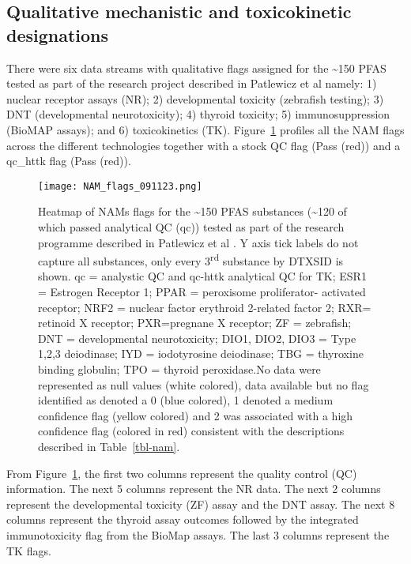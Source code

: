 \documentclass[
  super,
  preprint,
  3p]{elsarticle}
\begin{document}
\hypertarget{qualitative-mechanistic-and-toxicokinetic-designations}{%
\subsection{Qualitative mechanistic and toxicokinetic
designations}\label{qualitative-mechanistic-and-toxicokinetic-designations}}

There were six data streams with qualitative flags assigned for the
\textasciitilde150 PFAS tested as part of the research project described
in Patlewicz et al \citep{patlewicz_towards_2022} namely: 1) nuclear
receptor assays (NR); 2) developmental toxicity (zebrafish testing); 3)
DNT (developmental neurotoxicity); 4) thyroid toxicity; 5)
immunosuppression (BioMAP assays); and 6) toxicokinetics (TK).
Figure~\ref{fig-nams} profiles all the NAM flags across the different
technologies together with a stock QC flag \citep{smeltz_targeted_2023}
(Pass (red)) and a qc\_httk flag (Pass (red)).

\begin{figure}

{\centering \texttt{[image: NAM\_flags\_091123.png]}

}

\caption{\label{fig-nams}Heatmap of NAMs flags for the
\textasciitilde150 PFAS substances (\textasciitilde120 of which passed
analytical QC (qc)) tested as part of the research programme described
in Patlewicz et al \citep{patlewicz_towards_2022}. Y axis tick labels do
not capture all substances, only every 3\textsuperscript{rd} substance
by DTXSID is shown. qc = analystic QC and qc-httk analytical QC for TK;
ESR1 = Estrogen Receptor 1; PPAR = peroxisome proliferator- activated
receptor; NRF2 = nuclear factor erythroid 2-related factor 2; RXR=
retinoid X receptor; PXR=pregnane X receptor; ZF = zebrafish; DNT =
developmental neurotoxicity; DIO1, DIO2, DIO3 = Type 1,2,3 deiodinase;
IYD = iodotyrosine deiodinase; TBG = thyroxine binding globulin; TPO =
thyroid peroxidase.No data were represented as null values (white
colored), data available but no flag identified as denoted a 0 (blue
colored), 1 denoted a medium confidence flag (yellow colored) and 2 was
associated with a high confidence flag (colored in red) consistent with
the descriptions described in Table~\ref{tbl-nam}.}

\end{figure}

From Figure~\ref{fig-nams}, the first two columns represent the quality
control (QC) information. The next 5 columns represent the NR data. The
next 2 columns represent the developmental toxicity (ZF) assay and the
DNT assay. The next 8 columns represent the thyroid assay outcomes
followed by the integrated immunotoxicity flag from the BioMap assays.
The last 3 columns represent the TK flags.
\end{document}
